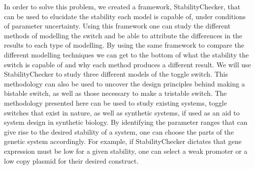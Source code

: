 In order to solve this problem, we created a framework, StabilityChecker, that can be used to elucidate the stability each model is capable of, under conditions of parameter uncertainty. Using this framework one can study the different methods of modelling the switch and be able to attribute the differences in the results to each type of modelling. By using the same framework to compare the different modelling techniques we can get to the bottom of what the stability the switch is capable of and why each method produces a different result. We will use StabilityChecker to study three different models of the toggle switch. This methodology can also be used to uncover the design principles behind making a bistable switch, as well as those necessary to make a tristable switch. The methodology presented here can be used to study existing systems, toggle switches that exist in nature, as well as synthetic systems, if used as an aid to system design in synthetic biology. By identifying the parameter ranges that can give rise to the desired stability of a system, one can choose the parts of the genetic system accordingly. For example, if StabilityChecker dictates that gene expression must be low for a given stability, one can select a weak promoter or a low copy plasmid for their desired construct. 

